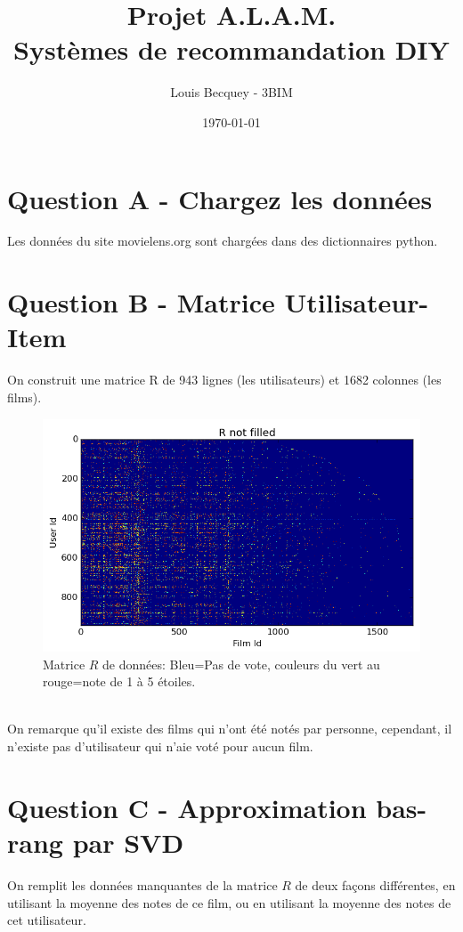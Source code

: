 \documentclass[12pt,a4paper]{article}
\begin{document}
\title{Projet A.L.A.M.\\ Systèmes de recommandation DIY}
\date{\today}
\author{Louis Becquey - 3BIM}
\maketitle
\newpage

\section{Question A - Chargez les données}
Les données du site movielens.org sont chargées dans des dictionnaires python.
\section{Question B - Matrice Utilisateur-Item}
On construit une matrice R de 943 lignes (les utilisateurs) et 1682 colonnes (les films).
\begin{figure}[h!]
	\centering
	\includegraphics[scale=0.5]{R-Not-Filled.png}
	\caption{Matrice $R$ de données: Bleu=Pas de vote, couleurs du vert au rouge=note de 1 à 5 étoiles.}
\end{figure}
\\
On remarque qu'il existe des films qui n'ont été notés par personne, cependant, il n'existe pas d'utilisateur qui n'aie voté pour aucun film.
\newpage

\section{Question C - Approximation bas-rang par SVD}
On remplit les données manquantes de la matrice $R$ de deux façons différentes, en utilisant la moyenne des notes de ce film, ou en utilisant la moyenne des notes de cet utilisateur.\\
\end{document}
